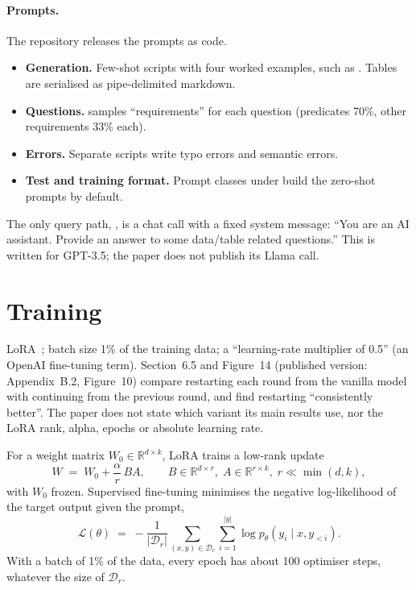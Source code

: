 \paragraph{Prompts.} The repository releases the prompts as code.
\begin{itemize}
\item \textbf{Generation.} Few-shot scripts with four worked examples, such as
. Tables are serialised as pipe-delimited markdown.
\item \textbf{Questions.}  samples ``requirements'' for each question
(predicates 70\%, other requirements 33\% each).
\item \textbf{Errors.} Separate scripts write typo errors and semantic errors.
\item \textbf{Test and training format.} Prompt classes under  build the zero-shot
prompts by default.
\end{itemize}
The only query path, , is a chat call with a fixed system message: ``You are an
AI assistant. Provide an answer to some data/table related questions.'' This is written for GPT-3.5; the paper does not
publish its Llama call.

\section{Training}\label{sec:paper-training}

\begin{paperbox}[title={Fine-tuning, as published}]
LoRA~\cite{hu2021lora}; batch size 1\% of the training data; a ``learning-rate multiplier of 0.5'' (an OpenAI
fine-tuning term). Section~6.5 and Figure~14 (published version: Appendix~B.2, Figure~10) compare restarting each round from the vanilla model with continuing from
the previous round, and find restarting ``consistently better''. The paper does not state which variant its main
results use, nor the LoRA rank, alpha, epochs or absolute learning rate.
\end{paperbox}

For a weight matrix $W_0\in\mathbb{R}^{d\times k}$, LoRA trains a low-rank update
\begin{equation}
  W \;=\; W_0 + \frac{\alpha}{r}\, B A, \qquad B\in\mathbb{R}^{d\times r},\; A\in\mathbb{R}^{r\times k},\; r \ll
  \min(d,k),
  \label{eq:lora}
\end{equation}
with $W_0$ frozen. Supervised fine-tuning minimises the negative log-likelihood of the target output given the prompt,
\begin{equation}
  \mathcal{L}(\theta) \;=\; -\frac{1}{|\mathcal{D}_r|}\sum_{(x,y)\in\mathcal{D}_r} \sum_{i=1}^{|y|}
  \log p_\theta\!\left(y_i \mid x, y_{<i}\right).
  \label{eq:sft}
\end{equation}
With a batch of 1\% of the data, every epoch has about 100 optimiser steps, whatever the size of $\mathcal{D}_r$.

